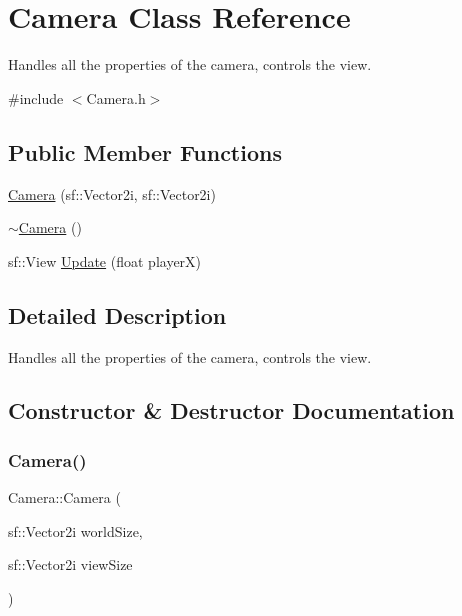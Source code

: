 \hypertarget{class_camera}{}\section{Camera Class Reference}
\label{class_camera}


Handles all the properties of the camera, controls the view.  




{\ttfamily \#include $<$Camera.\+h$>$}

\subsection*{Public Member Functions}
\begin{DoxyCompactItemize}
\item 
\hyperlink{class_camera_ac66d9226b88695dcd665d9c089b18219}{Camera} (sf\+::\+Vector2i, sf\+::\+Vector2i)
\item 
\hyperlink{class_camera_ad1897942d0ccf91052386388a497349f}{$\sim$\+Camera} ()
\item 
sf\+::\+View \hyperlink{class_camera_a261c43250d32bcc95b26f092225a9d2f}{Update} (float playerX)
\end{DoxyCompactItemize}


\subsection{Detailed Description}
Handles all the properties of the camera, controls the view. 



\subsection{Constructor \& Destructor Documentation}
\mbox{\label{class_camera_ac66d9226b88695dcd665d9c089b18219}} 
\subsubsection{\texorpdfstring{Camera()}{Camera()}}
{\footnotesize\ttfamily Camera\+::\+Camera (\begin{DoxyParamCaption}\item[{sf\+::\+Vector2i}]{world\+Size,  }\item[{sf\+::\+Vector2i}]{view\+Size }\end{DoxyParamCaption})}

